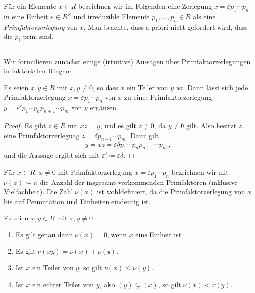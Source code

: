 \section{}

Für ein Elemente $x \in R$ bezeichnen wir im Folgenden eine Zerlegung $x = \varepsilon p_1 \dotsm p_n$ in eine Einheit $\varepsilon \in R^\times$ und irreduzible Elemente $p_1, \dotsc, p_n \in R$ als eine \emph{Primfaktorzerlegung} von $x$.
Man beachte, dass a priori nicht gefordert wird, dass die $p_i$ prim sind.




\subsection{}

Wir formulieren zunächst einige (intuitive) Aussagen über Primfaktorzerlegungen in faktoriellen Ringen:

\begin{lemma}
  \label{lemma: extension of prime factorizations}
  Es seien $x, y \in R$ mit $x, y \neq 0$, so dass $x$ ein Teiler von $y$ ist.
  Dann lässt sich jede Primfaktorzerlegung $x = \varepsilon p_1 \dotsm p_n$ von $x$ zu einer Primfaktorzerlegung $y = \varepsilon' p_1 \dotsm p_n p_{n+1} \dotsm p_m$ von $y$ ergänzen.
\end{lemma}

\begin{proof}
  Es gibt $z \in R$ mit $xz = y$, und es gilt $z \neq 0$, da $y \neq 0$ gilt.
  Also besitzt $z$ eine Primfaktorzerlegung $z = \delta p_{n+1} \dotsm p_m$.
  Dann gilt
  \[
      y
    = xz
    = \varepsilon \delta p_1 \dotsm p_n p_{n+1} \dotsm p_m \,,
  \]
  und die Aussage ergibt sich mit $\varepsilon' \coloneqq \varepsilon \delta$.
\end{proof}

Für $x \in R$, $x \neq 0$ mit Primfaktorzerlegung $x = \varepsilon p_1 \dotsm p_n$ bezeichnen wir mit $\nu(x) \coloneqq n$ die Anzahl der insgesamt vorkommenden Primfaktoren (inklusive Vielfachheit).
Die Zahl $\nu(x)$ ist wohldefiniert, da die Primfaktorzerlegung von $x$ bis auf Permutation und Einheiten eindeutig ist.

\begin{lemma}
  \label{lemma: number of prime factors}
  Es seien $x, y \in R$ mit $x, y \neq 0$.
  \begin{enumerate}
    \item
      Es gilt genau dann $\nu(x) = 0$, wenn $x$ eine Einheit ist.
    \item
      Es gilt $\nu(x y) = \nu(x) + \nu(y)$.
    \item
      Ist $x$ ein Teiler von $y$, so gilt $\nu(x) \leq \nu(y)$.
    \item
      Ist $x$ ein echter Teiler von $y$, also $(y) \subsetneq (x)$, so gilt $\nu(x) < \nu(y)$.
  \end{enumerate}
\end{lemma}


